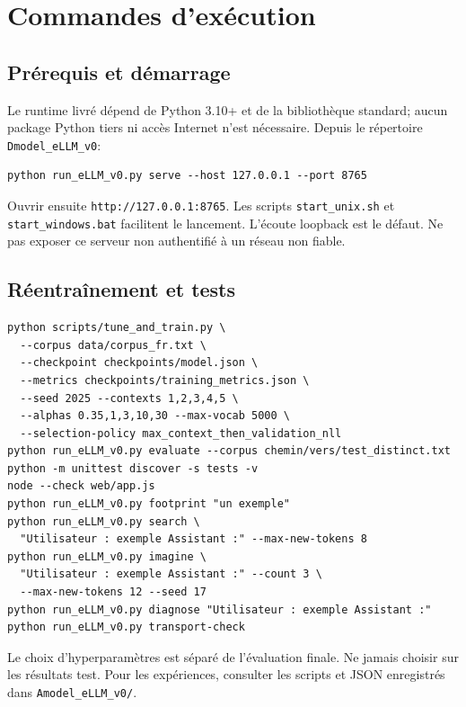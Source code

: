 \documentclass[11pt,a4paper]{article}
\begin{document}
\section{Commandes d'exécution}
\subsection{Prérequis et démarrage}
Le runtime livré dépend de Python 3.10+ et de la bibliothèque standard; aucun package Python tiers ni accès Internet n'est nécessaire. Depuis le répertoire \texttt{Dmodel\_eLLM\_v0}:
\begin{verbatim}
python run_eLLM_v0.py serve --host 127.0.0.1 --port 8765
\end{verbatim}
Ouvrir ensuite \texttt{http://127.0.0.1:8765}. Les scripts \texttt{start\_unix.sh} et \texttt{start\_windows.bat} facilitent le lancement. L'écoute loopback est le défaut. Ne pas exposer ce serveur non authentifié à un réseau non fiable.
\subsection{Réentraînement et tests}
\begin{verbatim}
python scripts/tune_and_train.py \
  --corpus data/corpus_fr.txt \
  --checkpoint checkpoints/model.json \
  --metrics checkpoints/training_metrics.json \
  --seed 2025 --contexts 1,2,3,4,5 \
  --alphas 0.35,1,3,10,30 --max-vocab 5000 \
  --selection-policy max_context_then_validation_nll
python run_eLLM_v0.py evaluate --corpus chemin/vers/test_distinct.txt
python -m unittest discover -s tests -v
node --check web/app.js
python run_eLLM_v0.py footprint "un exemple"
python run_eLLM_v0.py search \
  "Utilisateur : exemple Assistant :" --max-new-tokens 8
python run_eLLM_v0.py imagine \
  "Utilisateur : exemple Assistant :" --count 3 \
  --max-new-tokens 12 --seed 17
python run_eLLM_v0.py diagnose "Utilisateur : exemple Assistant :"
python run_eLLM_v0.py transport-check
\end{verbatim}
Le choix d'hyperparamètres est séparé de l'évaluation finale. Ne jamais choisir sur les résultats test. Pour les expériences, consulter les scripts et JSON enregistrés dans \texttt{Amodel\_eLLM\_v0/}.
\end{document}
